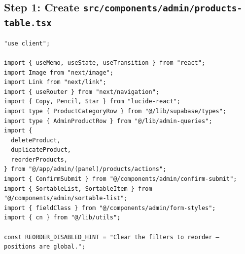 \documentclass[11pt,a4paper]{article}
\begin{document}
\subsection*{Step 1: Create \texttt{src/components/admin/products-table.tsx}}

\begin{lstlisting}
"use client";

import { useMemo, useState, useTransition } from "react";
import Image from "next/image";
import Link from "next/link";
import { useRouter } from "next/navigation";
import { Copy, Pencil, Star } from "lucide-react";
import type { ProductCategoryRow } from "@/lib/supabase/types";
import type { AdminProductRow } from "@/lib/admin-queries";
import {
  deleteProduct,
  duplicateProduct,
  reorderProducts,
} from "@/app/admin/(panel)/products/actions";
import { ConfirmSubmit } from "@/components/admin/confirm-submit";
import { SortableList, SortableItem } from "@/components/admin/sortable-list";
import { fieldClass } from "@/components/admin/form-styles";
import { cn } from "@/lib/utils";

const REORDER_DISABLED_HINT = "Clear the filters to reorder — positions are global.";


\end{lstlisting}
\end{document}
